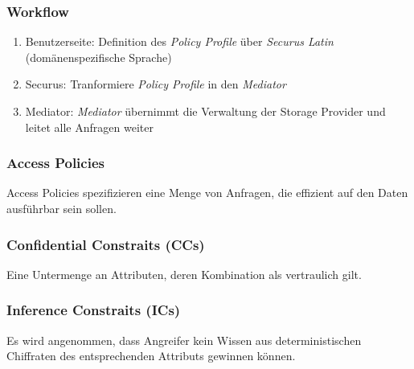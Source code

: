 \subsubsection{Workflow}
\begin{enumerate}
	\item Benutzerseite: Definition des \textit{Policy Profile} über \textit{Securus Latin} (domänenspezifische Sprache)
	\item Securus: Tranformiere \textit{Policy Profile} in den \textit{Mediator}
	\item Mediator: \textit{Mediator} übernimmt die Verwaltung der Storage Provider und leitet alle Anfragen weiter
\end{enumerate}

\subsubsection{Access Policies} 
Access Policies spezifizieren eine Menge von Anfragen, die effizient auf den Daten ausführbar sein sollen.

\subsubsection{Confidential Constraits (CCs)}
Eine Untermenge an Attributen, deren Kombination als vertraulich gilt.

\subsubsection{Inference Constraits (ICs)}
Es wird angenommen, dass Angreifer kein Wissen aus deterministischen Chiffraten des entsprechenden Attributs gewinnen können.

